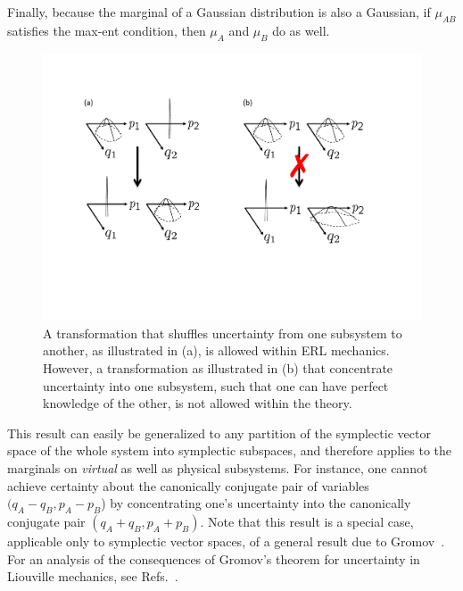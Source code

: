\documentclass[pra,superscriptaddress,nofootinbib,12pt]{revtex4-2}
\begin{document}
Finally, because the marginal of a Gaussian distribution is also a Gaussian, if $\mu_{AB}$ satisfies the max-ent condition, then $\mu_A$ and $\mu_B$ do as well.

\begin{figure}
\begin{center}
\includegraphics[width=1\hsize]{Gromov}
\caption{A transformation that shuffles uncertainty from one subsystem to another, as illustrated in (a), is allowed within ERL mechanics.  However, a transformation as illustrated in (b) that concentrate uncertainty into one subsystem, such that one can have perfect knowledge of the other, is not allowed within the theory.}\label{fig:Gromov}
\end{center}
\end{figure}



This result can easily be generalized to any partition of the symplectic vector space of the whole system into symplectic subspaces, and therefore applies to the marginals on \emph{virtual} as well as physical subsystems.  For instance, one cannot achieve certainty about the canonically conjugate pair of variables $(q_A - q_B,p_A - p_B$) by concentrating one's uncertainty into the canonically conjugate pair $(q_A + q_B, p_A + p_B)$.
Note that this result is a special case, applicable only to symplectic vector spaces, of a general result due to Gromov~\cite{Gro85}.  For an analysis of the consequences of Gromov's theorem for uncertainty in Liouville mechanics, see Refs.~\cite{GossonTextbook,Hsiao07,Gosson09}.
\end{document}
